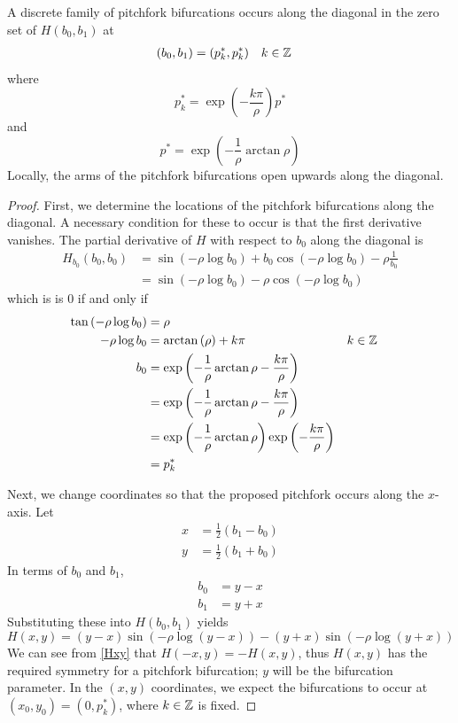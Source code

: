 \documentclass[thesis.tex]{subfiles}
\begin{document}
\begin{lemma}\label{pitchforkH}
A discrete family of pitchfork bifurcations occurs along the diagonal in the zero set of $H(b_0, b_1)$ at 
\begin{align*}
(b_0, b_1) &= (p_k^*, p_k^*) && k \in {\mathbb Z}
\end{align*}
where 
\begin{equation}\label{pkstar}
p^*_k = \exp\left(-\frac{k \pi}{\rho} \right) p^*
\end{equation}
and 
\begin{equation}\label{pstar}
p^* = \exp \left( -\frac{1}{\rho} \arctan \rho \right)
\end{equation}
Locally, the arms of the pitchfork bifurcations open upwards along the diagonal.
\begin{proof}
First, we determine the locations of the pitchfork bifurcations along the diagonal. A necessary condition for these to occur is that the first derivative vanishes. The partial derivative of $H$ with respect to $b_0$ along the diagonal is
\begin{align*}
H_{b_0}(b_0, b_0) &= 
\sin \left( -\rho \log b_0 \right)
+ b_0 \cos \left( - \rho \log b_0 \right)- \rho \frac{1}{b_0} \\
&= \sin \left( - \rho \log b_0 \right) - \rho \cos \left( - \rho \log b_0 \right)
\end{align*}
which is is 0 if and only if
\begin{align*}
\tan \left( -\rho \log b_0 \right) &=  \rho \\
-\rho \log b_0 &= \arctan \left( \rho\right) + k \pi && k \in {\mathbb Z} \\ 
b_0 &= \exp \left( -\frac{1}{\rho} \arctan \rho - \frac{k \pi}{\rho} \right) \\
&= \exp \left( -\frac{1}{\rho} \arctan \rho - \frac{k \pi}{\rho} \right)  \\
&= \exp \left( -\frac{1}{\rho} \arctan \rho \right) \exp \left( - \frac{k \pi}{\rho} \right) \\
&= p_k^*
\end{align*}

Next, we change coordinates so that the proposed pitchfork occurs along the $x$-axis. Let
\begin{align*}
x &= \frac{1}{2}(b_1 - b_0) \\
y &= \frac{1}{2}(b_1 + b_0)
\end{align*}
In terms of $b_0$ and $b_1$,
\begin{align*}
b_0 &= y - x \\
b_1 &= y + x
\end{align*}
Substituting these into $H(b_0, b_1)$ yields
\begin{equation}\label{Hxy}
H(x, y) = 
(y - x) \sin \left( -\rho \log(y - x) \right) - (y + x) \sin \left( - \rho \log (y + x) \right)
\end{equation}
We can see from \eqref{Hxy} that $H(-x, y) = -H(x, y)$, thus $H(x,y)$ has the required symmetry for a pitchfork bifurcation; $y$ will be the bifurcation parameter. In the $(x,y)$ coordinates, we expect the bifurcations to occur at $(x_0, y_0) = \left(0, p^*_k \right)$, where $k \in {\mathbb Z}$ is fixed.


\end{proof}
\end{lemma}
\end{document}
